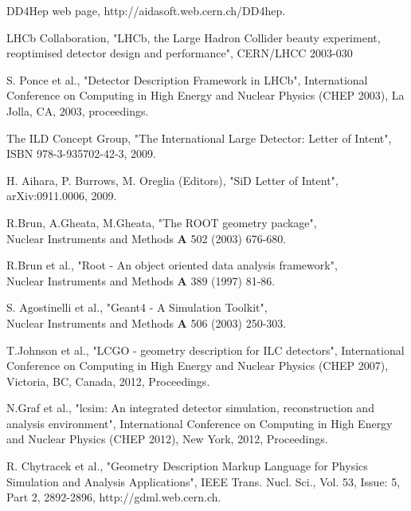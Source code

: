   DD4Hep web page, http://aidasoft.web.cern.ch/DD4hep.

 		LHCb Collaboration, 
                "LHCb, the Large Hadron Collider beauty experiment, reoptimised detector 
				design and performance", CERN/LHCC 2003-030

 S. Ponce et al., 
                "Detector Description Framework in LHCb", 
                International Conference on Computing in High Energy and Nuclear Physics  (CHEP 2003), 
                La Jolla, CA, 2003, proceedings. 

  The ILD Concept Group, 
                   "The International Large Detector: Letter of Intent",\\
                   ISBN 978-3-935702-42-3, 2009.

  H. Aihara, P. Burrows, M. Oreglia (Editors),
                   "SiD Letter of Intent",
                   arXiv:0911.0006, 2009.

 R.Brun, A.Gheata, M.Gheata, "The ROOT geometry package",\\
                    Nuclear Instruments and Methods {\bf{A}} 502 (2003) 676-680.

 R.Brun et al., 
                   "Root - An object oriented data analysis framework",\\
                    Nuclear Instruments and Methods {\bf{A}} 389 (1997) 81-86.

  S. Agostinelli et al., 
                   "Geant4 - A Simulation Toolkit", \\
                    Nuclear Instruments and Methods {\bf{A}} 506 (2003) 250-303.

 T.Johnson et al., 
                   "LCGO - geometry description for ILC detectors", 
                   International Conference on Computing in High Energy and Nuclear Physics  (CHEP 2007), 
                   Victoria, BC, Canada, 2012, Proceedings.

 N.Graf et al., 
                   "lcsim: An integrated detector simulation, 
                   reconstruction and analysis environment", 
                   International Conference on Computing in High Energy and Nuclear Physics (CHEP 2012),
                   New York, 2012, Proceedings.

 R. Chytracek et al.,
                   "Geometry Description Markup Language for Physics Simulation and Analysis
                   Applications",
                   IEEE Trans. Nucl. Sci., Vol. 53, Issue: 5, Part 2, 2892-2896,
                   http://gdml.web.cern.ch.

